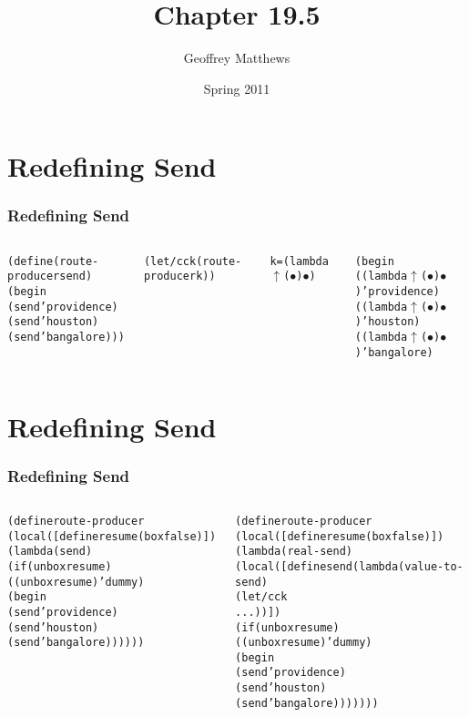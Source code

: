 \documentclass[slidestop,xcolor=pst,dvips]{beamer}
\title[Chapter 19.5]
{
Chapter 19.5
}
\subtitle{} %
\author[Geoffrey Matthews]
{Geoffrey Matthews}
\institute[WWU/CS]
{
  Department of Computer Science\\
  Western Washington University
}
\date{Spring 2011}
\newcommand{\sect}[1]{
\section{#1}
\begin{frame}[fragile]\frametitle{#1}
}
\newcommand{\lmb}{{lambda$\uparrow$}}
\newcommand{\bul}{{$\bullet$}}
\begin{document}
\begin{frame}
  \titlepage
\end{frame}


\tiny

\sect{Redefining Send}
\begin{columns}[t]
\begin{alltt}
(define (route-producer send)
  (begin
    (send 'providence)
    (send 'houston)
    (send 'bangalore)))

(let/cc k (route-producer k))

k = (\lmb (\bul) \bul)
\end{alltt}
\begin{alltt}

(begin
  ((\lmb (\bul) \bul) 'providence)
  ((\lmb (\bul) \bul) 'houston)
  ((\lmb (\bul) \bul) 'bangalore)
\end{alltt}
\end{columns}
\end{frame}

\sect{Redefining Send}
\begin{columns}[t]
\begin{alltt}
(define route-producer
  (local ([define resume (box false)])
    (lambda (send)
      (if (unbox resume)
          ((unbox resume) 'dummy)
          (begin
            (send 'providence)
            (send 'houston)
            (send 'bangalore))))))
\end{alltt}
\begin{alltt}
(define route-producer
  (local ([define resume (box false)])
    (lambda (real-send)
      (local ([define send (lambda (value-to-send)
                             (let/cc k
                               ...))])
        (if (unbox resume)
            ((unbox resume) 'dummy)
            (begin
              (send 'providence)
              (send 'houston)
              (send 'bangalore)))))))
\end{alltt}
\end{columns}
\end{frame}
\end{document}
